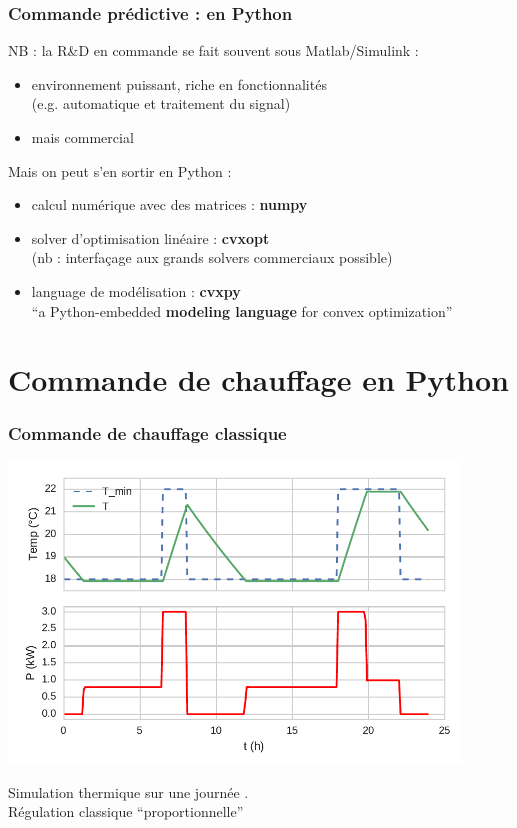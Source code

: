 \begin{frame}
  \frametitle{Commande prédictive : en Python}
  
  NB : la R\&D en commande se fait souvent sous Matlab/Simulink :
  \begin{itemize}
   \item environnement puissant, riche en fonctionnalités \\(e.g. automatique et traitement du signal)
   \item mais commercial 
  \end{itemize}

  \bigskip \pause
  
  Mais on peut s'en sortir en Python :
  
  \begin{itemize}
   \item calcul numérique avec des matrices : \textbf{numpy}
   \item solver d'optimisation linéaire : \textbf{cvxopt}\\
   (nb : interfaçage aux grands solvers commerciaux possible)
   \item language de modélisation : \textbf{cvxpy}\\
   {\footnotesize ``a Python-embedded \textbf{modeling language} for convex optimization''}
  \end{itemize}

  \bigskip
\end{frame}


\section{Commande de chauffage en Python}

\begin{frame}
  \frametitle{Commande de chauffage classique}
 
  \begin{center}
    \includegraphics[width=0.9\textwidth]{notebook/sim_Prop_fback.pdf}
    
    \footnotesize
     Simulation thermique sur une journée .\\
     Régulation classique ``proportionnelle''
  \end{center}
\end{frame}

